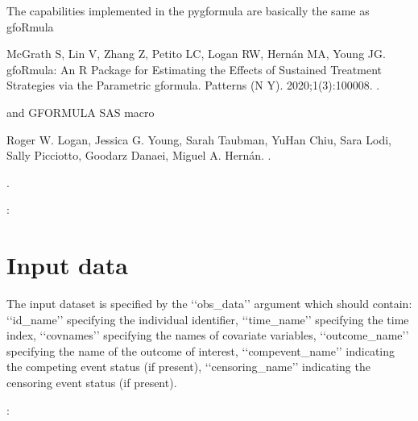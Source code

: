 \documentclass[letterpaper,10pt,english]{sphinxmanual}
\begin{document}
\sphinxAtStartPar
The capabilities implemented in the pygformula are basically the same as gfoRmula \sphinxstepexplicit %
\begin{footnote}[1]\label{\thesphinxscope.1}%
\sphinxAtStartFootnote
McGrath S, Lin V, Zhang Z, Petito LC, Logan RW, Hernán MA, Young JG. gfoRmula: An R Package for Estimating the Effects of Sustained Treatment Strategies via the Parametric g\sphinxhyphen{}formula. Patterns (N Y). 2020;1(3):100008. .
%
\end{footnote} and GFORMULA SAS macro \sphinxstepexplicit %
\begin{footnote}[2]\label{\thesphinxscope.2}%
\sphinxAtStartFootnote
Roger W. Logan, Jessica G. Young, Sarah Taubman, Yu\sphinxhyphen{}Han Chiu, Sara Lodi, Sally Picciotto, Goodarz Danaei, Miguel A. Hernán. .
%
\end{footnote}.

\sphinxAtStartPar
{}:


\section{Input data}
\label{\detokenize{Specifications/Input data:input-data}}\label{\detokenize{Specifications/Input data:id1}}\label{\detokenize{Specifications/Input data::doc}}
\sphinxAtStartPar
The input dataset is specified by the ‘‘obs\_data’’ argument which should contain: ‘‘id\_name’’ specifying
the individual identifier, ‘‘time\_name’’ specifying the time index, ‘‘covnames’’ specifying the names of covariate variables,
‘‘outcome\_name’’ specifying the name of the outcome of interest, ‘‘compevent\_name’’ indicating the competing
event status (if present), ‘‘censoring\_name’’ indicating the censoring event status (if present).

\sphinxAtStartPar
{}:
\end{document}
